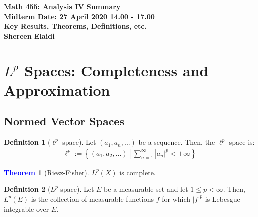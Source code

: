 \documentclass[11pt]{article}
\theoremstyle{definition}
\theoremstyle{definition}
\newcommand{\sets}[2]{ \left\{ #1\ |\ #2 \right\}}
\newtheorem{theorem}{\textcolor{blue}{Theorem}}
\theoremstyle{definition}
\newtheorem{definition}{\textcolor{OliveGreen}{Definition}}
\theoremstyle{remark}
\begin{document}
\begin{center}
	\textbf{Math 455: Analysis IV Summary} \\
	\textbf{Midterm Date: 27 April 2020 14.00 - 17.00} \\
	\textbf{Key Results, Theorems, Definitions, etc.} \\
	\textbf{Shereen Elaidi}
\end{center}

\begin{abstract}
	This document contains a summary of all the key definitions, results, and theorems from class. There are probably typos, and so I would be grateful if you brought those to my attention :-). 
	
	Syllabus: $L^p$ space, duality, weak convergence, Young, Holder, and Minkowski inequalities, point-set topology, topological space, dense sets, completeness, compactness, connectedness, path-connectedness, separability, Tychnoff theorem, Stone-Weierstrass Theorem, Arzela-Ascoli, Baire category theorem, open mapping theorem, closed graph theorem, uniform boudnedness principle, Hahn Banch theorem. 
\end{abstract}

\tableofcontents

\section{$L^p$ Spaces: Completeness and Approximation}
\subsection{Normed Vector Spaces}

\begin{definition}[$\ell^p$ space]
	Let $(a_1, a_n, ...)$ be a sequence. Then, the $\ell^p$-space is: 
	\begin{align}
		\ell^p := \sets{(a_1, a_2, ...)}{\sum_{n=1}^\infty |a_n|^p < +\infty}
	\end{align}
\end{definition}

\begin{theorem}[Riesz-Fisher] 
	$L^p(X)$ is complete. 
\end{theorem}

\begin{definition}[$L^p$ space]
	Let $E$ be a measurable set and let $1 \leq p < \infty$. Then, $L^p(E)$ is the collection of measurable functions $f$ for which $|f|^p$ is Lebesgue integrable over $E$. 
\end{definition}
\end{document}
